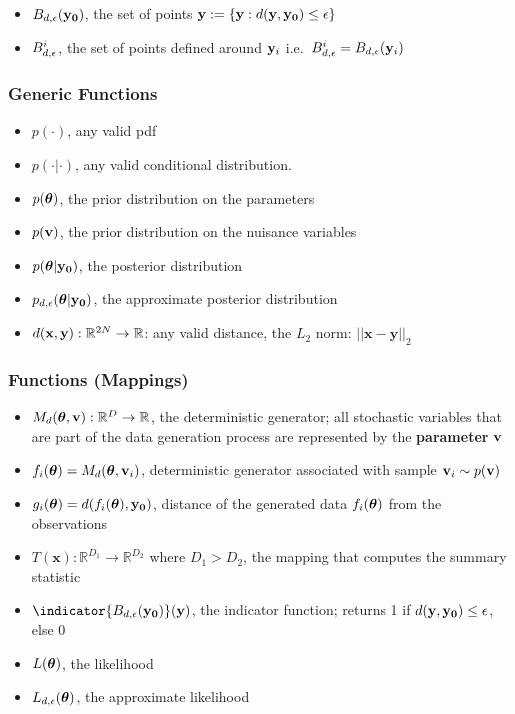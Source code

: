\begin{itemize}
\item $B_{d,\epsilon}(\mathbf{y_0})$, the set of points $\mathbf{y} := \{\mathbf{y}: d(\mathbf{y}, \mathbf{y_0}) \leq \epsilon \}$
\item $B_{d,\epsilon}^i$, the set of points defined around $\mathbf{y}_i$ i.e.\ $B_{d,\epsilon}^i = B_{d,\epsilon}(\mathbf{y}_i)$
\end{itemize}
    
\subsubsection*{Generic Functions}
\label{sec:generic-functions}

\begin{itemize}
\item $p(\cdot)$, any valid pdf
\item $p(\cdot | \cdot)$, any valid conditional distribution.
\item $p(\boldsymbol{\theta})$, the prior distribution on the parameters
\item $p(\mathbf{v})$, the prior distribution on the nuisance variables
\item $p(\boldsymbol{\theta}|\mathbf{y_0})$, the posterior distribution
\item $p_{d,\epsilon}(\boldsymbol{\theta}|\mathbf{y_0})$, the approximate posterior
  distribution  
\item $d(\mathbf{x}, \mathbf{y}): \mathbb{R}^{2N} \rightarrow \mathbb{R}$: any valid
  distance, the $L_2$ norm: $||\mathbf{x}-\mathbf{y}||_2$
\end{itemize}

\subsubsection*{Functions (Mappings)}
\label{sec:functions-mappings}

\begin{itemize}
\item $M_d(\boldsymbol{\theta}, \mathbf{v}): \mathbb{R}^D \rightarrow \mathbb{R}$, the deterministic
  generator; all stochastic variables that are part of the data generation process are represented by the \textbf{parameter} $\mathbf{v}$
\item $f_i(\boldsymbol{\theta}) = M_d(\boldsymbol{\theta}, \mathbf{v}_i)$, deterministic generator associated with sample $\mathbf{v}_i \sim p(\mathbf{v})$
\item $g_i(\boldsymbol{\theta}) = d(f_i(\boldsymbol{\theta}), \mathbf{y_0})$, distance of the generated data $f_i(\boldsymbol{\theta})$ from the observations
\item $T(\mathbf{x}): \mathbb{R}^{D_1} \rightarrow \mathbb{R}^{D_2}$
  where $D_1 > D_2$, the mapping that computes the summary statistic
\item $\indicator{\region(\data)}(\yb)$, the indicator function; returns 1 if $d(\mathbf{y}, \mathbf{y_0}) \leq \epsilon$, else 0
\item $L(\boldsymbol{\theta})$, the likelihood
\item $L_{d,\epsilon}(\boldsymbol{\theta})$, the approximate likelihood
\end{itemize}
